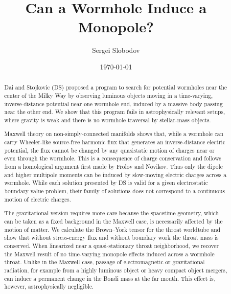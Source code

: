 \documentclass[aps,prd,10pt,onecolumn,nofootinbib,superscriptaddress,floatfix]{revtex4-2}
\begin{document}
\title{Can a Wormhole Induce a Monopole?}

\author{Sergei Slobodov}
\noaffiliation

\date{\today}

\begin{abstract}

Dai and Stojkovic (DS) proposed a program to search for potential wormholes
near the center of the Milky Way by observing luminous objects moving in a
time-varying, inverse-distance potential near one wormhole end, induced by a
massive body passing near the other end. We show that this program fails in
astrophysically relevant setups, where gravity is weak and there is no
wormhole traversal by stellar-mass objects.

Maxwell theory on non-simply-connected manifolds shows that, while a wormhole
can carry Wheeler-like source-free harmonic flux that generates an
inverse-distance electric potential, the flux cannot be changed by any
quasistatic motion of charges near or even through the wormhole. This is a
consequence of charge conservation and follows from a homological argument
first made by Frolov and Novikov. Thus only the dipole and higher multipole
moments can be induced by slow-moving electric charges across a wormhole.
While each solution presented by DS is valid for a given electrostatic
boundary-value problem, their family of solutions does not correspond to a
continuous motion of electric charges.

The gravitational version requires more care because the spacetime geometry,
which can be taken as a fixed background in the Maxwell case, is necessarily
affected by the motion of matter. We calculate the Brown--York tensor for the
throat worldtube and show that without stress-energy flux and without
boundary work the throat mass is conserved. When linearized near a
quasi-stationary throat neighborhood, we recover the Maxwell result of no
time-varying monopole effects induced across a wormhole throat. Unlike in the
Maxwell case, passage of electromagnetic or gravitational radiation, for
example from a highly luminous object or heavy compact object mergers, can
induce a permanent change in the Bondi mass at the far mouth. This effect is,
however, astrophysically negligible.

\end{abstract}

\maketitle
\end{document}
